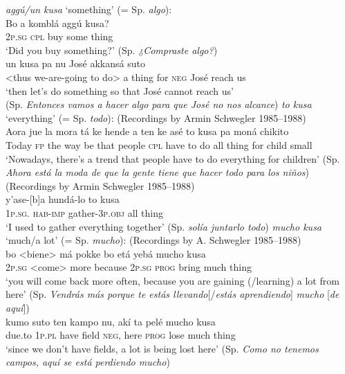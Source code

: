 \documentclass[output=paper,colorlinks,citecolor=brown]{langscibook}
\begin{document}
\ea\textit{aggú/un kusa} ‘something’ (= Sp. \textit{algo}):
\ea\label{ex:gut1} \citep[48--33]{Schwegler2013}\\
\gll Bo a komblá aggú kusa? \\
    \textsc{2p.sg} \textsc{cpl} buy some thing \\
\glt ‘Did you buy something?’  (Sp. \textit{¿Compraste algo?})
\ex \label{ex:gut2}\citep[261]{MagliaMoñino2015}\\
 un kusa pa nu José akkansá suto \\
    <thus we-are-going to do> a thing for \textsc{neg} José reach us \\
\glt ‘then let’s do something so that José cannot reach us’\\(Sp. \textit{Entonces vamos a hacer algo para que José no nos alcance})
\z
\ex \textit{to kusa} ‘everything’ (= Sp. \textit{todo}):
\ea\label{ex:gut3}(Recordings by Armin Schwegler 1985--1988)\\
\gll Aora jue la mora tá ke hende a ten ke asé to kusa pa moná chikito \\
     Today \textsc{fp} the way be that people \textsc{cpl} have to do all thing for child small \\
\glt ‘Nowadays, there's a trend that people have to do everything for children’ (Sp. \textit{Ahora está la moda de que la gente tiene que hacer todo para los niños})
\ex\label{ex:gut4}(Recordings by Armin Schwegler 1985--1988)\\
\gll y’ase-[b]a hundá-lo to kusa \\
    1\textsc{p.sg. hab-imp} gather-3\textsc{p.obj} all thing \\
\glt ‘I used to gather everything together’ (Sp. \textit{solía juntarlo todo})
\z
\ex \textit{mucho kusa} ‘much\slash a lot’ (= Sp. \textit{mucho}):
\ea\label{ex:gut5}(Recordings by A. Schwegler 1985--1988)\\
\gll bo <biene> má pokke bo etá yebá mucho kusa \\
2\textsc{p.sg} <come> more because 2\textsc{p.sg} \textsc{prog} bring much thing \\
\glt ‘you will come back more often, because you are gaining (/learning) a lot from here’ (Sp. \textit{Vendrás más porque te estás llevando}[/\textit{estás aprendiendo}] \textit{mucho} [\textit{de aquí}]) 
\ex\label{ex:gut6}\citep[215]{FriedemannRosselli1983}\\
\gll kumo suto ten kampo nu, akí ta pelé mucho kusa \\
due.to 1\textsc{p.pl} have field \textsc{neg}, here \textsc{prog} lose much thing \\
\glt ‘since we don’t have fields, a lot is being lost here’ (Sp. \textit{Como no tenemos campos, aquí se está perdiendo mucho})
\z
\z
\end{document}
